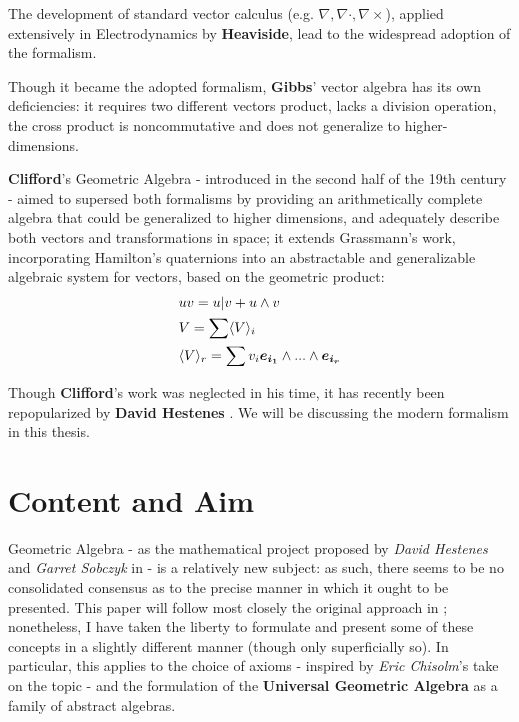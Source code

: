 The development of standard vector calculus (e.g. $\nabla, \nabla \cdot, \nabla \times$), applied extensively in Electrodynamics by \textbf{Heaviside}, lead to the widespread adoption of the formalism.

Though it became the adopted formalism, \textbf{Gibbs}' vector algebra has its own deficiencies: it requires two different vectors product, lacks a division operation, the cross product is noncommutative and does not generalize to higher-dimensions.

\textbf{Clifford}'s  Geometric Algebra - introduced in the second half of the 19th century - aimed to supersed both formalisms by providing an arithmetically complete algebra that could be generalized to higher dimensions, and adequately describe both vectors and transformations in space; it extends Grassmann's work, incorporating Hamilton's quaternions into an abstractable and generalizable algebraic system for vectors, based on the geometric product:
\begin{align*}
    &uv = u | v + u \wedge v\\
    &V = \sum \langle V\rangle_i\\
    &\langle V \rangle_{r} = \sum v_i\boldsymbol{e_{i_1}}\wedge ... \wedge \boldsymbol{e_{i_r}}
\end{align*}

Though \textbf{Clifford}'s work was neglected in his time, it has recently been repopularized by \textbf{David Hestenes} \cite{ga-origin}. We will be discussing the modern formalism in this thesis.

\newpage

\section{Content and Aim}

Geometric Algebra - as the mathematical project proposed by \textit{David Hestenes} and \textit{Garret Sobczyk} in \cite{ga-origin} - is a relatively new subject: as such, there seems to be no consolidated consensus as to the precise manner in which it ought to be presented. This paper will follow most closely the original approach in \cite{ga-origin}; nonetheless, I have taken the liberty to formulate and present some of these concepts in a slightly different manner (though only superficially so). In particular, this applies to the choice of axioms - inspired by \textit{Eric Chisolm}'s take on the topic \cite{ga-chisolm} - and the formulation of the \textbf{Universal Geometric Algebra} as a family of abstract algebras.

